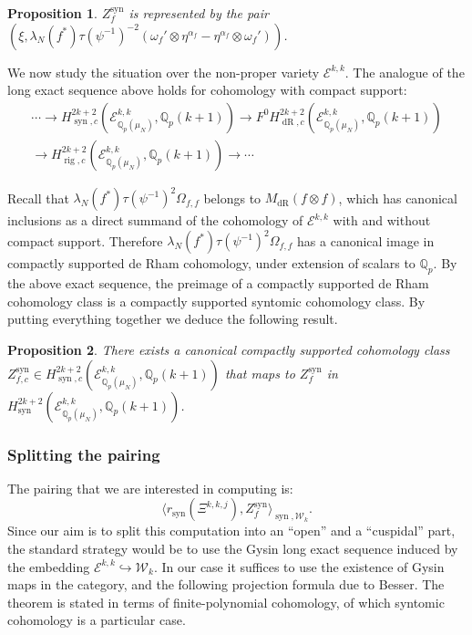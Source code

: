 \documentclass[10pt,a4paper]{amsart}
\newcommand{\Ell}{\mathcal{E}}
\newcommand{\KS}{\mathscr{W}}
\newcommand{\cBF}{\Xi}
\newcommand{\regulator}[1]{r_{#1}}
\newcommand{\rsyn}{\regulator{\syn}}
\DeclareMathOperator{\syn}{syn}
\newcommand{\Q}{\numberset{Q}}
\DeclareMathOperator{\dR}{dR}
\DeclareMathOperator{\rig}{rig}
\newcommand{\numberset}{\mathbb}
\newtheorem{proposition}{Proposition}
\begin{document}
  \begin{proposition}
    \label{prop:pair-representing-syn}
   $Z_f^{\syn}$ is represented by the pair $(\xi, \lambda_N(f^*)\tau(\psi^{-1})^{-2}(\omega_f'\otimes\eta^{\alpha_f} - \eta^{\alpha_f}\otimes\omega_f'))$.
  \end{proposition}

  We now study the situation over the non-proper variety $\Ell^{k,k}$. The analogue of the long exact sequence above holds for cohomology with compact support:
  \begin{multline*}
   \cdots \to H_{\syn,c}^{2k+2}(\Ell^{k,k}_{\Q_p(\mu_N)},\Q_p(k+1)) \to F^0 H_{\dR,c}^{2k+2}(\Ell^{k,k}_{\Q_p(\mu_N)}, \Q_p(k+1)) \\
   \to H_{\rig,c}^{2k+2}(\Ell^{k,k}_{\Q_p(\mu_N)},\Q_p(k+1)) \to \cdots
  \end{multline*}

  Recall that $\lambda_N(f^*)\tau(\psi^{-1})^2\Omega_{f,f}$ belongs to $M_{\dR}(f\otimes f)$, which has canonical inclusions as a direct summand of the cohomology of $\Ell^{k,k}$ with and without compact support. Therefore $\lambda_N(f^*)\tau(\psi^{-1})^2\Omega_{f,f}$ has a canonical image in compactly supported de Rham cohomology, under extension of scalars to $\Q_p$. By the above exact sequence, the preimage of a compactly supported de Rham cohomology class is a compactly supported syntomic cohomology class. By putting everything together we deduce the following result.

  \begin{proposition}
   \label{prop:syntomic-compact-support}
   There exists a canonical compactly supported cohomology class $Z^{\syn}_{f,c} \in H^{2k+2}_{\syn,c}(\Ell^{k,k}_{\Q_p(\mu_N)}, \Q_p(k+1))$ that maps to $Z_f^{\syn}$ in $H^{2k+2}_{\syn}(\Ell^{k,k}_{\Q_p(\mu_N)}, \Q_p(k+1))$.
  \end{proposition}

  \subsubsection*{Splitting the pairing}

   The pairing that we are interested in computing is:
   \[
       \langle \rsyn(\cBF^{k,k,j}), Z_f^{\syn} \rangle_{\syn, \KS_k}.
   \]
   Since our aim is to split this computation into an ``open'' and a ``cuspidal'' part, the standard strategy would be to use the Gysin long exact sequence induced by the embedding $\Ell^{k,k} \hookrightarrow \KS_k$. In our case it suffices to use the existence of Gysin maps in the category, and the following projection formula due to Besser. The theorem is stated in terms of finite-polynomial cohomology, of which syntomic cohomology is a particular case.
\end{document}
